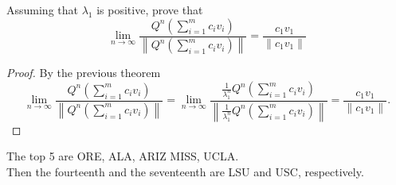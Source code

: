 \documentclass[letter]{article}
\newenvironment{menumerate}{\edef\backupindent{\the\parindent}
  \enumerate\setlength{\parindent}{\backupindent}}
  {\endenumerate}
\begin{document}
\begin{menumerate}
\begin{menumerate}
        \item Assuming that $\lambda_1$ is positive, prove that
            \begin{equation*}
                \lim_{n\to\infty} \frac{Q^n \left(\sum_{i=1}^m c_iv_i \right) }{\left\|Q^n \left(\sum_{i=1}^m c_iv_i \right)\right\|} = \frac{c_1 v_1}{\|c_1 v_1\|}
            \end{equation*}
        \begin{proof}
            By the previous theorem
            \begin{equation*}
                \lim_{n\to\infty} \frac{Q^n \left(\sum_{i=1}^m c_iv_i \right) }{\left\|Q^n \left(\sum_{i=1}^m c_iv_i \right)\right\|} =
                \lim_{n\to\infty} \frac{ \frac{1}{\lambda_1^n} Q^n \left(\sum_{i=1}^m c_iv_i \right) }{\left\| \frac{1}{\lambda_1^n} Q^n \left(\sum_{i=1}^m c_iv_i \right)\right\|}  = \frac{c_1 v_1}{\|c_1 v_1\|}.
            \end{equation*}
        \end{proof}
        \item The top 5 are ORE, ALA, ARIZ MISS, UCLA. \\Then the fourteenth and the seventeenth are LSU and USC, respectively.
    \end{menumerate}


\end{menumerate}
\end{document}
